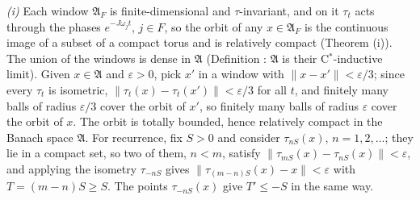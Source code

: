 \emph{(i)} Each window $\mathfrak{A}_{F}$ is finite-dimensional and $\tau$-invariant, and on it $\tau_{t}$ acts through the phases $e^{-J\omega_{j}t}$, $j \in F$, so the orbit of any $x \in \mathfrak{A}_{F}$ is the continuous image of a subset of a compact torus and is relatively compact (Theorem (i)). The union of the windows is dense in $\mathfrak{A}$ (Definition : $\mathfrak{A}$ is their C$^{*}$-inductive limit). Given $x \in \mathfrak{A}$ and $\varepsilon > 0$, pick $x'$ in a window with $\|x - x'\| < \varepsilon/3$; since every $\tau_{t}$ is isometric, $\|\tau_{t}(x) - \tau_{t}(x')\| < \varepsilon/3$ for all $t$, and finitely many balls of radius $\varepsilon/3$ cover the orbit of $x'$, so finitely many balls of radius $\varepsilon$ cover the orbit of $x$. The orbit is totally bounded, hence relatively compact in the Banach space $\mathfrak{A}$. For recurrence, fix $S > 0$ and consider $\tau_{nS}(x)$, $n = 1, 2, \dots$; they lie in a compact set, so two of them, $n < m$, satisfy $\|\tau_{mS}(x) - \tau_{nS}(x)\| < \varepsilon$, and applying the isometry $\tau_{-nS}$ gives $\|\tau_{(m - n)S}(x) - x\| < \varepsilon$ with $T = (m - n)S \ge S$. The points $\tau_{-nS}(x)$ give $T' \le -S$ in the same way.

